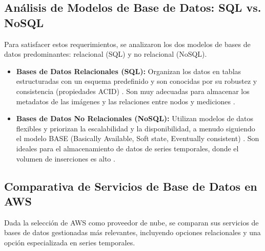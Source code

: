 \subsection{Análisis de Modelos de Base de Datos: SQL vs. NoSQL}

Para satisfacer estos requerimientos, se analizaron los dos modelos de bases de datos predominantes: relacional (SQL) y no relacional (NoSQL).

\begin{itemize}
    \item \textbf{Bases de Datos Relacionales (SQL):} Organizan los datos en tablas estructuradas con un esquema predefinido y son conocidas por su robustez y consistencia (propiedades ACID) \cite{oracle2024sql}. Son muy adecuadas para almacenar los metadatos de las imágenes y las relaciones entre nodos y mediciones \cite{mongodb2024sqlvsnosql}.
    \item \textbf{Bases de Datos No Relacionales (NoSQL):} Utilizan modelos de datos flexibles y priorizan la escalabilidad y la disponibilidad, a menudo siguiendo el modelo BASE (Basically Available, Soft state, Eventually consistent) \cite{mongodb2024sqlvsnosql}. Son ideales para el almacenamiento de datos de series temporales, donde el volumen de inserciones es alto \cite{aws2024sqlvsnosql}.
\end{itemize}

\subsection{Comparativa de Servicios de Base de Datos en AWS}
\label{subsec:comparativa_db_aws}

Dada la selección de AWS como proveedor de nube, se comparan sus servicios de bases de datos gestionadas más relevantes, incluyendo opciones relacionales y una opción especializada en series temporales.

